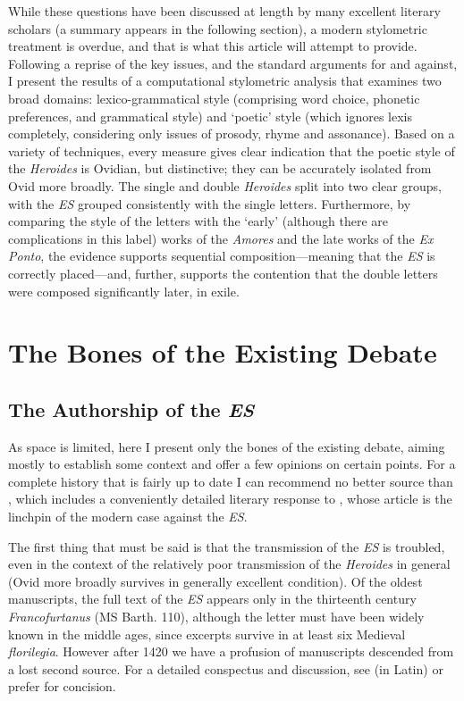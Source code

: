\documentclass[twocolumn, switch, a4paper]{article} %
\begin{document}
While these questions have been discussed at length by many excellent literary
scholars (a summary appears in the following section), a modern stylometric
treatment is overdue, and that is what this article will attempt to provide.
Following a reprise of the key issues, and the standard arguments for and
against, I present the results of a computational stylometric analysis that
examines two broad domains: lexico-grammatical style (comprising word choice,
phonetic preferences, and grammatical style) and `poetic' style (which ignores
lexis completely, considering only issues of prosody, rhyme and assonance).
Based on a variety of techniques, every measure gives clear indication that
the poetic style of the \emph{Heroides} is Ovidian, but distinctive; they can
be accurately isolated from Ovid more broadly. The single and double
\emph{Heroides} split into two clear groups, with the \emph{ES} grouped
consistently with the single letters. Furthermore, by comparing the style of
the letters with the `early' (although there are complications in this label)
works of the \emph{Amores} and the late works of the \emph{Ex Ponto}, the
evidence supports sequential composition---meaning that the \emph{ES} is
correctly placed---and, further, supports the contention that the double
letters were composed significantly later, in exile.

\section{The Bones of the Existing Debate}
\label{sec:bones}

\subsection{The Authorship of the \emph{ES}}

As space is limited, here I present only the bones of the existing debate,
aiming mostly to establish some context and offer a few opinions on certain
points. For a complete history that is fairly up to date I can recommend no
better source than , which includes a
conveniently detailed literary response to , whose article
is the linchpin of the modern case against the \emph{ES}.

The first thing that must be said is that the transmission of the \emph{ES} is
troubled, even in the context of the relatively poor transmission of the
\emph{Heroides} in general (Ovid more broadly survives in generally excellent
condition). Of the oldest manuscripts, the full text of the \emph{ES} appears
only in the thirteenth century \emph{Francofurtanus} (MS Barth. 110), although
the letter must have been widely known in the middle ages, since excerpts
survive in at least six Medieval \emph{florilegia}. However after 1420 we have
a profusion of manuscripts descended from a lost second source. For a detailed
conspectus and discussion, see  (in Latin) or prefer
 for concision.
\end{document}
